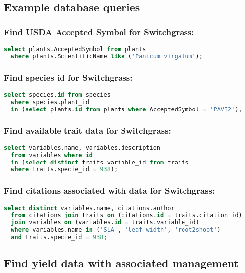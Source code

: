 \begin{enumerate}
\begin{description}
\end{description}

\subsection{Example database queries}
\subsubsection{Find USDA Accepted Symbol for Switchgrass:}
\begin{lstlisting}[language=SQL]
  select plants.AcceptedSymbol from plants 
  where plants.ScientificName like ('Panicum virgatum');
\end{lstlisting}

\subsubsection{Find species id for Switchgrass:}

\begin{lstlisting}[language=SQL]
  select species.id from species 
  where species.plant_id 
  in (select plants.id from plants where AcceptedSymbol = 'PAVI2');
\end{lstlisting}

\subsubsection{Find available trait data for Switchgrass:}
\begin{lstlisting}[language=SQL]
  select variables.name, variables.description 
  from variables where id 
  in (select distinct traits.variable_id from traits 
  where traits.specie_id = 938);
\end{lstlisting}

\subsubsection{Find citations associated with data for Switchgrass:}
\begin{lstlisting}[language=SQL]
  select distinct variables.name, citations.author 
  from citations join traits on (citations.id = traits.citation_id) 
  join variables on (variables.id = traits.variable_id) 
  where variables.name in ('SLA', 'leaf_width', 'root2shoot') 
  and traits.specie_id = 938;
\end{lstlisting}

\subsection{Find yield data with associated management}


\end{enumerate}
